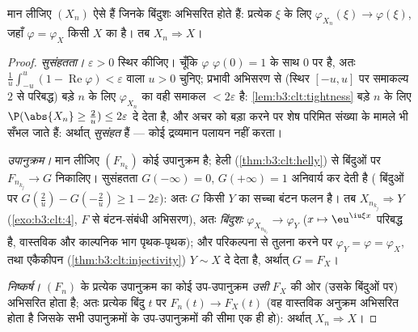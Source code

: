 \begin{theorem}[लेवी की सांतत्य प्रमेय]
\label{thm:b3:clt:levy}
मान लीजिए $(X_n)$ ऐसे  हैं जिनके  बिंदुशः
अभिसरित होते हैं: प्रत्येक $\xi$ के लिए $\varphi_{X_n}(\xi) \to
\varphi(\xi)$, जहाँ $\varphi =
\varphi_X$ किसी
 $X$ का  है। तब $X_n \Rightarrow X$।
\end{theorem}

\begin{proof}
\emph{सुसंहतता।} $\varepsilon > 0$ स्थिर कीजिए। चूँकि $\varphi$ $\varphi(0) = 1$ के साथ $0$
पर  है, अतः $\frac1u\int_{-u}^u(1 - \operatorname{Re}\varphi) <
\varepsilon$ वाला $u > 0$ चुनिए; प्रभावी अभिसरण से (स्थिर
$[-u,u]$ पर समाकल्य $2$ से परिबद्ध) बड़े $n$ के लिए $\varphi_{X_n}$ का वही
समाकल $< 2\varepsilon$ है: \cref{lem:b3:clt:tightness} बड़े $n$ के लिए $\P(\abs{X_n} \geq \frac2u)
\leq 2\varepsilon$ दे देता है, और अचर
को बड़ा करने पर शेष परिमित संख्या के मामले भी सँभल जाते हैं: अर्थात्
 \emph{सुसंहत} हैं --- कोई द्रव्यमान पलायन नहीं करता।

\emph{उपानुक्रम।} मान लीजिए $(F_{n_k})$ कोई उपानुक्रम है; हेली (\cref{thm:b3:clt:helly})
से  बिंदुओं पर $F_{n_{k_j}} \to G$ निकालिए। सुसंहतता $G(-\infty) = 0$, $G(+\infty) = 1$
अनिवार्य कर देती है ( बिंदुओं पर $G(\frac2u) - G(-\frac2u) \geq 1 -
2\varepsilon$): अतः $G$ किसी
 $Y$ का सच्चा बंटन फलन है। तब $X_{n_{k_j}} \Rightarrow Y$ (\cref{exo:b3:clt:4}, $F$
से बंटन-संबंधी अभिसरण), अतः \emph{बिंदुशः} $\varphi_{X_{n_{k_j}}} \to \varphi_Y$ ($x
\mapsto \eu^{\iu\xi x}$ परिबद्ध
 है, वास्तविक और काल्पनिक भाग पृथक-पृथक); और परिकल्पना से तुलना
करने पर $\varphi_Y = \varphi = \varphi_X$, तथा एकैकीपन (\cref{thm:b3:clt:injectivity}) $Y \sim X$ दे देता है, अर्थात् $G =
F_X$।

\emph{निष्कर्ष।} $(F_n)$ के प्रत्येक उपानुक्रम का कोई उप-उपानुक्रम
\emph{उसी} $F_X$ की ओर (उसके  बिंदुओं पर) अभिसरित होता है;
अतः प्रत्येक  बिंदु $t$ पर $F_n(t) \to F_X(t)$ (वह वास्तविक अनुक्रम
अभिसरित होता है जिसके सभी उपानुक्रमों के उप-उपानुक्रमों की सीमा एक
ही हो): अर्थात् $X_n \Rightarrow X$।
\end{proof}

